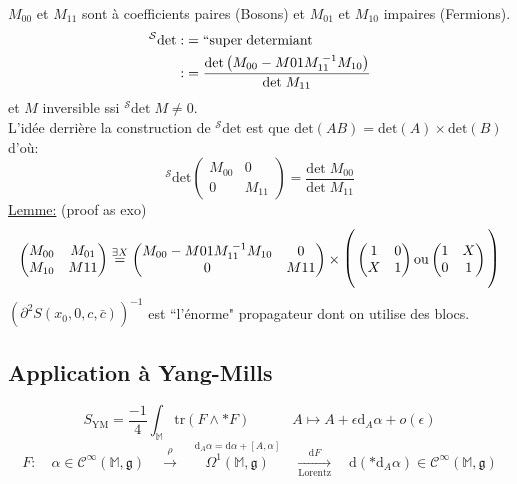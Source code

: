 \documentclass[a4paper,11pt]{article}
\renewcommand{\d}{{\mathrm{d}}}
\begin{document}
$M_{00}$ et $M_{11}$ sont à coefficients paires (Bosons) et $M_{01}$ et $M_{10}$ impaires (Fermions). 
\begin{align*}
^\mathcal{S}\mathrm{det} :&= ``\mathrm{super}\;\mathrm{determiant}\\
:&=\frac{\mathrm{det}\left(M_{00}-M{01}M_{11}^{\;-1}M_{10}\right)}{\mathrm{det}\;M_{11}}
\end{align*}
et $M$ inversible ssi $^\mathcal{S}\mathrm{det}\;M \ne 0$.\\L'idée derrière la construction de $^\mathcal{S}\mathrm{det}$ est que $\mathrm{det}(AB)=\mathrm{det}(A)\times\mathrm{det}(B)$ d'où: $$^\mathcal{S}\mathrm{det} \left(\begin{matrix}
M_{00}&0\\0&M_{11}
\end{matrix}\right) = \frac{\mathrm{det}\; M_{00}}{\mathrm{det}\; M_{11}}$$
\underline{Lemme:} (proof as exo)
$$\left(\begin{matrix}
M_{00} & M_{01}\\
M_{10} & M{11}
\end{matrix}\right)
\overset{\exists X}=
\left(\begin{matrix}
M_{00}-M{01}M_{11}^{\;-1}M_{10} & 0\\
0 & M{11}
\end{matrix}\right)
\times
\mathlarger{\mathlarger{\Bigg(}}\left(\begin{matrix}
1 & 0\\ X & 1
\end{matrix}\right)
\mathrm{ou}
\left(\begin{matrix}
1 & X\\ 0 & 1
\end{matrix}\right)\mathlarger{\mathlarger{\Bigg)}}
$$
$\left(\partial^2S(x_0,0,c,\bar c)\right)^{-1}$ est ``l'énorme" propagateur dont on utilise des blocs.

\subsection{Application à Yang-Mills}
$$S_\mathrm{YM}= \frac{-1}4 \int_\mathbb{M}\mathrm{tr}(F\wedge*F)\quad\quad\quad A\mapsto A+\epsilon\d_A\alpha + o(\epsilon)$$
$$F: \quad \alpha \in \mathcal{C}^\infty(\mathbb{M},\mathfrak{g}) \quad \overset\rho\longrightarrow\quad  \overset{\d_A\alpha = \d\alpha+[A,\alpha]}{\Omega^1(\mathbb{M},\mathfrak{g})} \quad \underset{\mathrm{Lorentz}}{\overset{\d F}\longrightarrow} \quad \d(*\d_A\alpha)\in \mathcal{C}^\infty(\mathbb{M},\mathfrak{g})$$
\end{document}
